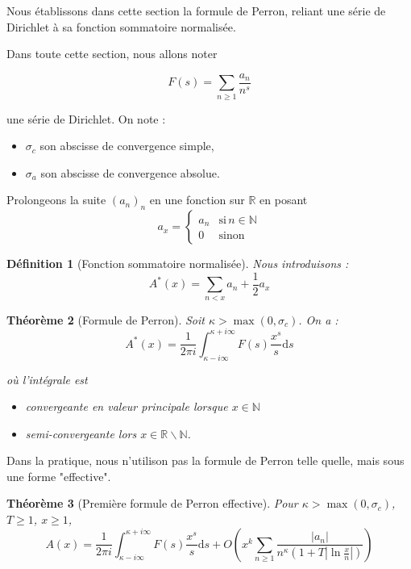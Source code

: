 \documentclass[french]{report}
\newtheorem{theorem}{Théorème}[section]
\newtheorem{definition}[theorem]{Définition}
\begin{document}
Nous établissons dans cette section la formule de Perron, reliant une série de Dirichlet à sa fonction sommatoire normalisée.

Dans toute cette section, nous allons noter

\[ F(s) =\sum_{n\geq1}\frac{a_n}{n^s}\]

une série de Dirichlet. On note :
\begin{itemize}
  \item $\sigma_c$ son abscisse de convergence simple,
  \item $\sigma_a$ son abscisse de convergence absolue.
\end{itemize}

Prolongeons la suite $(a_n)_n$ en une fonction sur $\mathbb{R}$ en posant
\[
  a_x=
  \begin{cases}
    a_n & \text{si}\,n\in\mathbb{N} \\
    0  & \text{sinon}
  \end{cases}
\]
\begin{definition}[Fonction sommatoire normalisée]
  Nous introduisons :
  \[ A^*(x) = \sum_{n<x}a_n + \frac{1}{2}a_x \]
\end{definition}

\begin{theorem}[Formule de Perron]
  Soit $\kappa>\max(0,\sigma_c)$. On a :
  \[
    A^*(x) = \frac{1}{2\pi i}\int_{\kappa-i\infty}^{\kappa+i\infty}F(s)\frac{x^s}{s}\mathrm{d}s
  \]

  où l'intégrale est
  \begin{itemize}
    \item convergeante en valeur principale lorsque $x\in\mathbb{N}$
    \item semi-convergeante lors $x\in\mathbb{R}\backslash\mathbb{N}$.
  \end{itemize}
\end{theorem}

Dans la pratique, nous n'utilison pas la formule de Perron telle quelle, mais sous une forme "effective".

\begin{theorem}[Première formule de Perron effective]
  Pour $\kappa>\max(0,\sigma_c)$, $T\geq1$, $x\geq1$,
  \[ A(x) = \frac{1}{2\pi i}\int_{\kappa-i\infty}^{\kappa+i\infty}F(s)\frac{x^s}{s}\mathrm{d}s + O\left(x^k\sum_{n\geq1}\frac{|a_n|}{n^\kappa(1+T|\ln\frac{x}{n}|)}\right) \]
\end{theorem}
\end{document}
